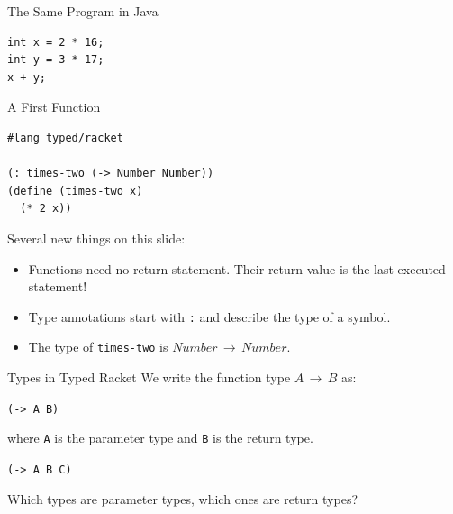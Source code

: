 \documentclass{beamer}
\begin{document}
\begin{frame}[fragile]{The Same Program in Java}
\begin{lstlisting}[style=Java]
int x = 2 * 16;
int y = 3 * 17;
x + y;
\end{lstlisting}
\end{frame}

\begin{frame}[fragile]{A First Function}
\begin{lstlisting}
#lang typed/racket

(: times-two (-> Number Number))
(define (times-two x)
  (* 2 x))
\end{lstlisting}

\pause{}

Several new things on this slide:

\begin{itemize}
\pause{} \item Functions need no return statement. Their return value is the last executed statement!
\pause{} \item Type annotations start with \lstinline{:} and describe the type of a symbol.
\pause{} \item The type of \lstinline{times-two} is $Number \, \rightarrow \, Number$.
\end{itemize}
\end{frame}

\begin{frame}[fragile]{Types in Typed Racket}
We write the function type $A \, \rightarrow \, B$ as:

\begin{center}
  \lstinline{(-> A B)}
\end{center}

where \lstinline{A} is the parameter type and \lstinline{B} is the return type.

\vspace{1.5cm}

\pause{}

\begin{center}
  \lstinline{(-> A B C)}
\end{center}

Which types are parameter types, which ones are return types?
\end{frame}
\end{document}
